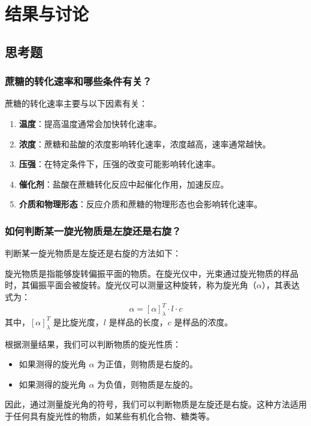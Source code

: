 \section{结果与讨论}

\subsection{思考题}

\subsubsection{蔗糖的转化速率和哪些条件有关？}

蔗糖的转化速率主要与以下因素有关：

\begin{enumerate}
    \item \textbf{温度}：提高温度通常会加快转化速率。
    \item \textbf{浓度}：蔗糖和盐酸的浓度影响转化速率，浓度越高，速率通常越快。
    \item \textbf{压强}：在特定条件下，压强的改变可能影响转化速率。
    \item \textbf{催化剂}：盐酸在蔗糖转化反应中起催化作用，加速反应。
    \item \textbf{介质和物理形态}：反应介质和蔗糖的物理形态也会影响转化速率。
\end{enumerate}

\subsubsection{如何判断某一旋光物质是左旋还是右旋？}

判断某一旋光物质是左旋还是右旋的方法如下：

旋光物质是指能够旋转偏振平面的物质。在旋光仪中，光束通过旋光物质的样品时，其偏振平面会被旋转。旋光仪可以测量这种旋转，称为旋光角（\(\alpha\)），其表达式为：
\[ \alpha = [\alpha]_\lambda^T \cdot l \cdot c \]
其中，\([\alpha]_\lambda^T\) 是比旋光度，\(l\) 是样品的长度，\(c\) 是样品的浓度。

根据测量结果，我们可以判断物质的旋光性质：
\begin{itemize}
    \item 如果测得的旋光角 \(\alpha\) 为正值，则物质是右旋的。
    \item 如果测得的旋光角 \(\alpha\) 为负值，则物质是左旋的。
\end{itemize}

因此，通过测量旋光角的符号，我们可以判断物质是左旋还是右旋。这种方法适用于任何具有旋光性的物质，如某些有机化合物、糖类等。

